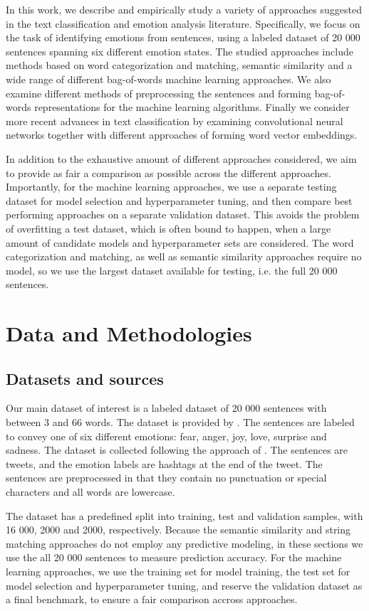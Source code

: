 \documentclass[conference]{IEEEtran}
\begin{document}
In this work, we describe and empirically study a variety of approaches suggested in the text classification and emotion analysis literature. Specifically, we focus on the task of identifying emotions from sentences, using a labeled dataset of 20 000 sentences spanning six different emotion states. The studied approaches include methods based on word categorization and matching, semantic similarity and a wide range of different bag-of-words machine learning approaches. We also examine different methods of  preprocessing the sentences and forming bag-of-words representations for the machine learning algorithms. Finally we consider more recent advances in text classification by examining convolutional neural networks together with different approaches of forming word vector embeddings. 

In addition to the exhaustive amount of different approaches considered, we aim to provide as fair a comparison as possible across the different approaches. Importantly, for the machine learning approaches, we use a separate testing dataset for model selection and hyperparameter tuning, and then compare best performing approaches on a separate validation dataset. This avoids the problem of overfitting a test dataset, which is often bound to happen, when a large amount of candidate models and hyperparameter sets are considered. The word categorization and matching, as well as semantic similarity approaches require no model, so we use the largest dataset available for testing, i.e. the full 20 000 sentences.

\section{Data and Methodologies}
\subsection{Datasets and sources}
Our main dataset of interest is a labeled dataset of 20 000 sentences with between 3 and 66 words. The dataset is provided by \cite{kaggledata}. The sentences are labeled to convey one of six different emotions: fear, anger, joy, love, surprise and sadness. The dataset is collected following the approach of \cite{saravia-etal-2018-carer}. The sentences are tweets, and the emotion labels are hashtags at the end of the tweet. The sentences are preprocessed in that they contain no punctuation or special characters and all words are lowercase.

The dataset has a predefined split into training, test and validation samples, with 16 000, 2000 and 2000, respectively. Because the semantic similarity and string matching approaches do not employ any predictive modeling, in these sections we use the all 20 000 sentences to measure prediction accuracy. For the machine learning approaches, we use the training set for model training, the test set for model selection and hyperparameter tuning, and reserve the validation dataset as a final benchmark, to ensure a fair comparison accross approaches.
\end{document}
